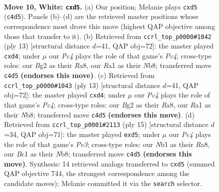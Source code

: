 \documentclass[11pt]{article}
\begin{document}
\clearpage

\begin{figure}[p]\centering
\begin{subfigure}{0.46\textwidth}\centering
\resizebox{\linewidth}{!}{%
\newchessgame
\chessboard[
  setfen={1rbq1rk1/pp3pbp/2n2np1/2ppp3/2P4P/4PNP1/PP1P1PB1/RNBQ1RK1 w - - 0 10},
  showmover=false,
  pgfstyle=straightmove, color=movearrow, markmove={c4-d5}
]}
\caption{}
\end{subfigure}\hfill
\begin{subfigure}{0.46\textwidth}\centering
\resizebox{\linewidth}{!}{%
\newchessgame
\chessboard[
  setfen={rnbq1rk1/pp2ppbp/3p1np1/2p5/2PPP3/2N2N2/PP2BPPP/R1BQ1RK1 b - - 3 7},
  showmover=false,
  pgfstyle=straightmove, color=movearrow, markmove={c5-d4}
]}
\caption{}
\end{subfigure}
\\[4pt]
\begin{subfigure}{0.46\textwidth}\centering
\resizebox{\linewidth}{!}{%
\newchessgame
\chessboard[
  setfen={rnbq1rk1/pp2ppbp/3p1np1/2p5/2PPP3/2N2N2/PP2BPPP/R1BQ1RK1 b - - 3 7},
  showmover=false,
  pgfstyle=straightmove, color=movearrow, markmove={c5-d4}
]}
\caption{}
\end{subfigure}\hfill
\begin{subfigure}{0.46\textwidth}\centering
\resizebox{\linewidth}{!}{%
\newchessgame
\chessboard[
  setfen={rnbq1rk1/pp3pbp/3ppnp1/2pP4/4P3/2N2NP1/PPP2PBP/R1BQ1RK1 b - - 0 8},
  showmover=false,
  pgfstyle=straightmove, color=movearrow, markmove={e6-d5}
]}
\caption{}
\end{subfigure}
\caption{\textbf{Move 10, White: \texttt{cxd5}.} (a) Our position; Melanie plays \texttt{cxd5} (\texttt{c4d5}). Panels (b)--(d) are the retrieved master positions whose correspondence most drove this move (highest QAP objective among those that transfer to it). (b) Retrieved from \texttt{ccrl\_top\_p0000\#1042} (ply 13) [structural distance $d$=41, QAP obj=72]: the master played \texttt{cxd4}; under $\mu$ our \emph{Pc4} plays the role of that game's \emph{Pc4}; cross-type roles: our \emph{B}g2 as their \emph{R}a8, our \emph{R}a1 as their \emph{N}b8; transferred move \texttt{c4d5} \textbf{(endorses this move)}. (c) Retrieved from \texttt{ccrl\_top\_p0000\#1043} (ply 13) [structural distance $d$=41, QAP obj=72]: the master played \texttt{cxd4}; under $\mu$ our \emph{Pc4} plays the role of that game's \emph{Pc4}; cross-type roles: our \emph{B}g2 as their \emph{R}a8, our \emph{R}a1 as their \emph{N}b8; transferred move \texttt{c4d5} \textbf{(endorses this move)}. (d) Retrieved from \texttt{ccrl\_top\_p0001\#2113} (ply 15) [structural distance $d$=34, QAP obj=71]: the master played \texttt{exd5}; under $\mu$ our \emph{Pc4} plays the role of that game's \emph{Pe3}; cross-type roles: our \emph{N}b1 as their \emph{R}a8, our \emph{B}c1 as their \emph{N}b8; transferred move \texttt{c4d5} \textbf{(endorses this move)}. Synthesis: 14 retrieved analogs transferred to \texttt{cxd5} (summed QAP objective 744, the strongest correspondence among the candidate moves); Melanie committed it via the \texttt{search} selector.}
\label{fig:thought-m18}
\end{figure}
\end{document}
